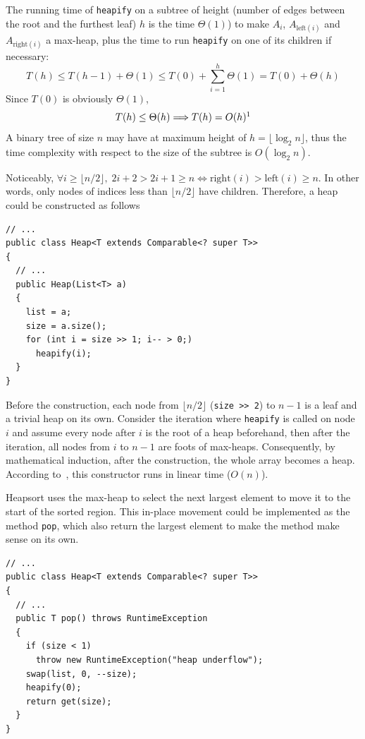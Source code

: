 \documentclass[a4paper,12pt]{article}
\begin{document}
The running time of \verb|heapify| on a subtree of height (number of edges
between the root and the furthest leaf) $h$ is the time $\Theta(1)$) to make
$A_i$, $A_{\mathrm{left}(i)}$ and $A_{\mathrm{right}(i)}$ a max-heap, plus
the time to run \verb|heapify| on one of its children if necessary:
\[T(h) \le T(h - 1) + \Theta(1)
       \le T(0) + \sum_{i=1}^{h}\Theta(1) = T(0) + \Theta(h)\]
Since $T(0)$ is obviously $\Theta(1)$,
\[T(h) \leq \Theta(h) \Longrightarrow T(h) = O(h)\footnotemark\]
A binary tree of size $n$ may have at maximum height of
$h = \lfloor\log_2 n\rfloor$, thus the time complexity with respect to
the size of the subtree is $O(\log_2 n)$.

Noticeably, $\forall i \ge \lfloor n/2\rfloor,\; 2i + 2 > 2i + 1 \ge n
\iff \mathrm{right}(i) > \mathrm{left}(i) \ge n$.  In other words,
only nodes of indices less than $\lfloor n/2\rfloor$ have children.
Therefore, a heap could be constructed as follows
\begin{verbatim}
// ...
public class Heap<T extends Comparable<? super T>>
{
  // ...
  public Heap(List<T> a)
  {
    list = a;
    size = a.size();
    for (int i = size >> 1; i-- > 0;)
      heapify(i);
  }
}
\end{verbatim}

Before the construction, each node from $\lfloor n/2\rfloor$ (\verb|size >> 2|)
to $n - 1$ is a leaf and a trivial heap on its own.  Consider the iteration
where \verb|heapify| is called on node $i$ and assume every node after $i$
is the root of a heap beforehand, then after the iteration, all nodes from $i$
to $n - 1$ are foots of max-heaps.  Consequently, by mathematical induction,
after the construction, the whole array becomes a heap.  According
to~\cite[p. 159]{clrs}, this constructor runs in linear time ($O(n)$).

Heapsort uses the max-heap to select the next largest element to move it
to the start of the sorted region.  This in-place movement could be implemented
as the method \verb|pop|, which also return the largest element to make
the method make sense on its own.
\begin{verbatim}
// ...
public class Heap<T extends Comparable<? super T>>
{
  // ...
  public T pop() throws RuntimeException
  {
    if (size < 1)
      throw new RuntimeException("heap underflow");
    swap(list, 0, --size);
    heapify(0);
    return get(size);
  }
}
\end{verbatim}
\end{document}
